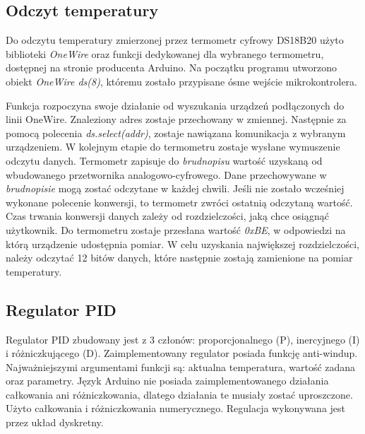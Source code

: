 \subsection{Odczyt temperatury}
Do odczytu temperatury zmierzonej przez termometr cyfrowy DS18B20 użyto biblioteki \textit{OneWire} oraz funkcji dedykowanej dla wybranego termometru, dostępnej na stronie producenta Arduino. Na początku programu utworzono obiekt \textit{OneWire ds(8)}, któremu zostało przypisane ósme wejście mikrokontrolera.

Funkcja rozpoczyna swoje działanie od wyszukania urządzeń podłączonych do linii OneWire. Znaleziony adres zostaje przechowany w zmiennej. Następnie za pomocą polecenia \textit{ds.select(addr)}, zostaje nawiązana komunikacja z wybranym urządzeniem. W kolejnym etapie do termometru zostaje wysłane wymuszenie odczytu danych. Termometr zapisuje do \textit{brudnopisu} wartość uzyskaną od wbudowanego przetwornika analogowo-cyfrowego. Dane przechowywane w \textit{brudnopisie} mogą zostać odczytane w każdej chwili. Jeśli nie zostało wcześniej wykonane polecenie konwersji, to termometr zwróci ostatnią odczytaną wartość. Czas trwania konwersji danych zależy od rozdzielczości, jaką chce osiągnąć użytkownik. Do termometru zostaje przesłana wartość \textit{0xBE}, w odpowiedzi na którą urządzenie udostępnia pomiar. W celu uzyskania największej rozdzielczości, należy odczytać 12 bitów danych, które następnie zostają zamienione na pomiar temperatury.

\subsection{Regulator PID} %
Regulator PID zbudowany jest z 3 członów: proporcjonalnego (P), inercyjnego (I) i różniczkującego (D). Zaimplementowany regulator posiada funkcję anti-windup. Najważniejszymi argumentami funkcji są: aktualna temperatura, wartość zadana oraz parametry. Język Arduino nie posiada zaimplementowanego działania całkowania ani różniczkowania, dlatego działania te musiały zostać uproszczone. Użyto całkowania i różniczkowania numerycznego. Regulacja wykonywana jest przez układ dyskretny.

